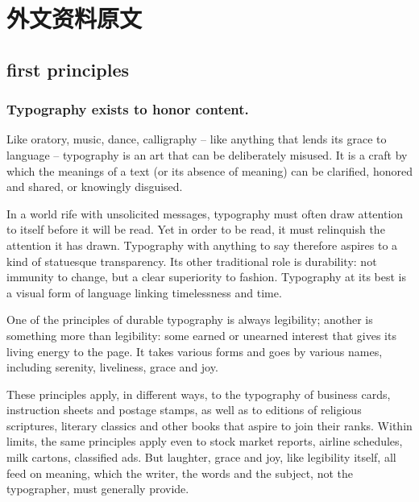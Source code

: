 ﻿%

\section{外文资料原文}
\label{cha:engorg}
\subsection[First Principles]{first principles}

\subsubsection{Typography exists to honor content.}

Like oratory, music, dance, calligraphy -- like anything that lends its grace to language -- typography is an art that can be deliberately misused. It is a craft by which the meanings of a text (or its absence of meaning) can be clarified, honored and shared, or knowingly disguised.

In a world rife with unsolicited messages, typography must often draw attention to itself before it will be read. Yet in order to be read, it must relinquish the attention it has drawn. Typography with anything to say therefore aspires to a kind of statuesque transparency. Its other traditional role is durability: not immunity to change, but a clear superiority to fashion. Typography at its best is a visual form of language linking timelessness and time.

One of the principles of durable typography is always legibility; another is something more than legibility: some earned or unearned interest that gives its living energy to the page. It takes various forms and goes by various names, including serenity, liveliness, grace and joy.

These principles apply, in different ways, to the typography of business cards, instruction sheets and postage stamps, as well as to editions of religious scriptures, literary classics and other books that aspire to join their ranks. Within limits, the same principles apply even to stock market reports, airline schedules, milk cartons, classified ads. But laughter, grace and joy, like legibility itself, all feed on meaning, which the writer, the words and the subject, not the typographer, must generally provide.

